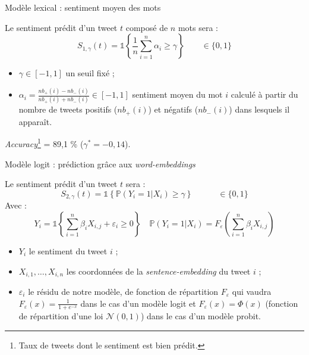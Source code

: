 \documentclass[10pt,xcolor=table,color={dvipsnames,usenames},ignorenonframetext,usepdftitle=false,french]{beamer}
\begin{document}
\begin{frame}{Modèle lexical : sentiment moyen des mots}
\protect\hypertarget{moduxe8le-lexical-sentiment-moyen-des-mots}{}

Le sentiment prédit d’un tweet \(t\) composé de \(n\) mots sera :
\[S_{1,\gamma}(t) = \mathds{1}\left\{ \frac{1}{n} \sum \limits_{i=1}^n \alpha_i \geq \gamma\right\}  \qquad \in \{ 0,1 \}\]

\begin{itemize}
\item $\gamma \in [-1,1]$ un seuil fixé ;
\item $\alpha_i = \frac{nb_+(i) - nb_-(i)}{nb_+(i) + nb_-(i)} \in [-1,1]$  sentiment moyen du mot $i$ calculé à partir du nombre de tweets positifs ($nb_+(i)$) et négatifs ($nb_-(i)$) dans lesquels il apparaît. 
\end{itemize}

\faArrowCircleRight{}
\emph{Accuracy}\footnote{Taux de tweets dont le sentiment est bien prédit.}
= 89,1 \% (\(\gamma^* = -0,14\)).

\end{frame}

\begin{frame}{Modèle logit : prédiction grâce aux
\emph{word-embeddings}}
\protect\hypertarget{moduxe8le-logit-pruxe9diction-gruxe2ce-aux-word-embeddings}{}

Le sentiment prédit d’un tweet \(t\) sera :
\[S_{2,\gamma}(t) =\mathds{1}\left\{   \mathbb{P}(Y_i = 1 | X_{i}) \ge \gamma\right\} \qquad \quad \in \{ 0,1 \}\]
Avec :
\[Y_i = \mathds{1}\left\{ \sum_{i = 1}^n \beta_i X_{i,j} + \varepsilon_i \geq 0 \right\} \quad  \mathbb{P}(Y_i = 1 | X_{i}) = F_{\varepsilon}\left(\sum_{i = 1}^n \beta_i X_{i,j}\right)\]

\normalsize
\begin{itemize}
\item $Y_i$ le sentiment du tweet $i$ ;
\item $X_{i,1}, \dots, X_{i,n}$ les coordonnées de la \emph{sentence-embedding} du tweet $i$ ;
\item $\varepsilon_i$ le résidu de notre modèle, de fonction de répartition $F_{\varepsilon}$ qui vaudra $F_{\varepsilon}(x) = \frac{1}{1 + e^{-x}}$ dans le cas d'un modèle logit et $F_{\varepsilon}(x) = \Phi(x)$ (fonction de répartition d'une loi $\mathcal{N}(0, 1)$) dans le cas d'un modèle probit. 
\end{itemize}

\end{frame}
\end{document}
